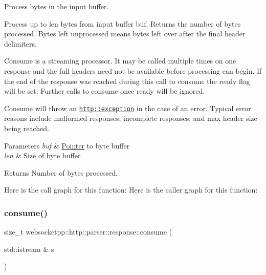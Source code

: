 Process bytes in the input buffer. 

Process up to len bytes from input buffer buf. Returns the number of bytes processed. Bytes left unprocessed means bytes left over after the final header delimiters.

Consume is a streaming processor. It may be called multiple times on one response and the full headers need not be available before processing can begin. If the end of the response was reached during this call to consume the ready flag will be set. Further calls to consume once ready will be ignored.

Consume will throw an \href{http::exception}{\tt http\+::exception} in the case of an error. Typical error reasons include malformed responses, incomplete responses, and max header size being reached.


\begin{DoxyParams}{Parameters}
{\em buf} & \mbox{\hyperlink{struct_pointer}{Pointer}} to byte buffer \\
\hline
{\em len} & Size of byte buffer \\
\hline
\end{DoxyParams}
\begin{DoxyReturn}{Returns}
Number of bytes processed. 
\end{DoxyReturn}
Here is the call graph for this function\+:
Here is the caller graph for this function\+:
\mbox{\label{classwebsocketpp_1_1http_1_1parser_1_1response_a5b274a9e5766e679f0939a7e1ecbad56}} 
\subsubsection{\texorpdfstring{consume()}{consume()}\hspace{0.1cm}{\footnotesize\ttfamily [2/2]}}
{\footnotesize\ttfamily size\+\_\+t websocketpp\+::http\+::parser\+::response\+::consume (\begin{DoxyParamCaption}\item[{std\+::istream \&}]{s }\end{DoxyParamCaption})\hspace{0.3cm}{\ttfamily [inline]}}



